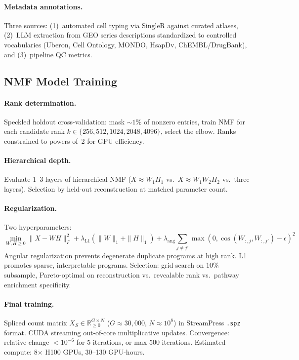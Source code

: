 \documentclass[10pt,twocolumn,letterpaper]{article}
\begin{document}
\paragraph{Metadata annotations.} Three sources: (1)~automated cell typing via
SingleR against curated atlases, (2)~LLM extraction from GEO series
descriptions standardized to controlled vocabularies (Uberon, Cell Ontology,
MONDO, HsapDv, ChEMBL/DrugBank), and (3)~pipeline QC metrics.

\subsection{NMF Model Training}

\paragraph{Rank determination.} Speckled holdout cross-validation: mask
${\sim}1\%$ of nonzero entries, train NMF for each candidate rank
$k \in \{256, 512, 1024, 2048, 4096\}$, select the elbow. Ranks constrained
to powers of~2 for GPU efficiency.

\paragraph{Hierarchical depth.} Evaluate 1--3 layers of hierarchical NMF
($X \approx W_1 H_1$ vs.\ $X \approx W_1 W_2 H_2$ vs.\ three layers).
Selection by held-out reconstruction at matched parameter count.

\paragraph{Regularization.} Two hyperparameters:
\begin{equation}
  \min_{W,H \geq 0} \|X - WH\|_F^2
  + \lambda_{\text{L1}}(\|W\|_1 + \|H\|_1)
  + \lambda_{\text{ang}} \sum_{j \neq j'} \max(0, \cos(W_{:,j}, W_{:,j'}) - \epsilon)^2
\end{equation}
Angular regularization prevents degenerate duplicate programs at high rank.
L1 promotes sparse, interpretable programs. Selection: grid search on 10\%
subsample, Pareto-optimal on reconstruction vs.\ revealable rank vs.\ pathway
enrichment specificity.

\paragraph{Final training.} Spliced count matrix
$X_S \in \mathbb{R}_{\geq 0}^{G \times N}$ ($G \approx 30{,}000$,
$N \approx 10^8$) in StreamPress \texttt{.spz} format. CUDA streaming
out-of-core multiplicative updates. Convergence: relative change $< 10^{-6}$
for 5 iterations, or max 500 iterations. Estimated compute: 8$\times$ H100
GPUs, 30--130 GPU-hours.
\end{document}
